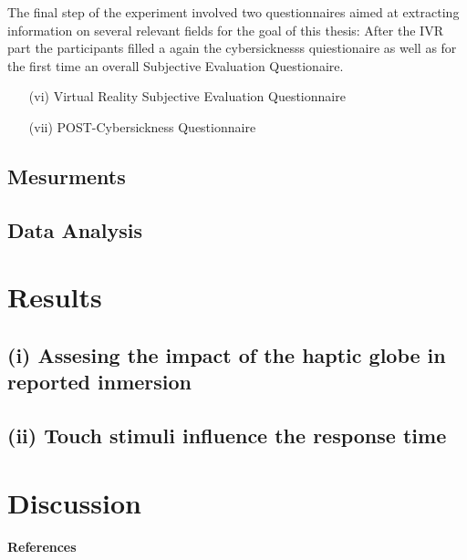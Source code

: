 \documentclass[12pt,oneside,openright]{report}
\begin{document}
The final step of the experiment involved two questionnaires aimed at extracting information on several relevant fields for the goal of this thesis:
After the IVR part the participants filled a again the cybersicknesss quiestionaire as well as for the first time an overall Subjective Evaluation Questionaire.
\begin{enumerate}
    \item[(vi)] Virtual Reality Subjective Evaluation Questionnaire
    \item[(vii)] POST-Cybersickness Questionnaire
\end{enumerate}
    \subsection*{Mesurments}
    \subsection*{Data Analysis}
\section*{Results}
    \subsection*{(i) Assesing the impact of the haptic globe in reported inmersion}
    \subsection*{(ii) Touch stimuli influence the response time}
\section*{Discussion}


\pagebreak


\paragraph{\textbf{References}}
\printbibliography[heading=none]
\end{document}
